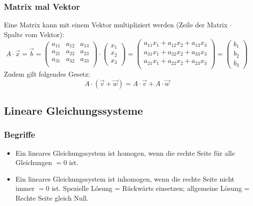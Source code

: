 \subsubsection{Matrix mal Vektor}
Eine Matrix kann mit einem Vektor multipliziert werden (Zeile der Matrix $\cdot$
Spalte vom Vektor):
\[ A \cdot \vec x = \vec b = \begin {pmatrix}
  a_{11} & a_{12} & a_{13} \\
  a_{21} & a_{22} & a_{23} \\
  a_{31} & a_{32} & a_{33} \\
\end {pmatrix} \cdot
  \left( \begin {array} {c} x_1 \\ x_2 \\ x_3 \end {array} \right) = 
  \left( \begin {array} {c}
            a_{11}x_1 + a_{12}x_2 + a_{13}x_3 \\
            a_{31}x_1 + a_{32}x_2 + a_{33}x_3 \\
            a_{21}x_1 + a_{22}x_2 + a_{23}x_3 \\
         \end {array}
  \right) =
  \left( \begin {array} {c} b_1 \\ b_2 \\ b_3 \end {array} \right)
     \]
Zudem gilt folgendes Gesetz:
\[ A \cdot (\vec v + \vec w) = A \cdot \vec v + A \cdot \vec w \]

\subsection{Lineare Gleichungssysteme}
\subsubsection{Begriffe}
\begin{itemize}
  \item Ein lineares Gleichungssystem ist homogen, wenn die rechte Seite
    für alle Gleichungen $= 0$ ist.
  \item Ein lineares Gleichungssystem ist inhomogen, wenn die rechte
    Seite nicht immer $= 0$ ist. Spezielle Lösung = Rückwärts einsetzen;
    allgemeine Lösung = Rechte Seite gleich Null.
\end{itemize}

